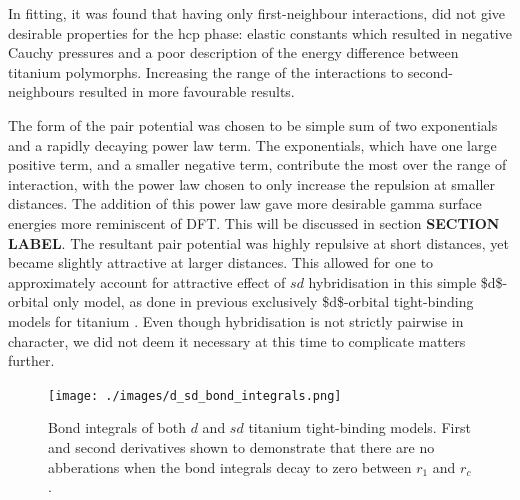 \documentclass[a4paper,12pt,oneside,print,numbered,index,PageStyleIII]{PhDThesisPSnPDF}
\begin{document}
In fitting, it was found that having only first-neighbour
interactions, did not give desirable properties for the hcp phase:
elastic constants which resulted in negative Cauchy pressures and a
poor description of the energy difference between titanium
polymorphs. Increasing the range of the interactions to
second-neighbours resulted in more favourable results.


The form of the pair potential was chosen to be simple sum of two
exponentials and a rapidly decaying power law term. The exponentials,
which have one large positive term, and a smaller negative term,
contribute the most over the range of interaction, with the power
law chosen to only increase the repulsion at smaller distances. The
addition of this power law gave more desirable gamma surface
energies more reminiscent of DFT. This will be discussed in section
\textbf{SECTION LABEL}. The resultant pair potential was highly repulsive
at short distances, yet became slightly
attractive at larger distances. This allowed for one to
approximately account for attractive effect of \(sd\) hybridisation
in this simple \$d\$-orbital only model, as done
in previous exclusively \$d\$-orbital tight-binding models for
titanium \cite{Girshick1998a}. Even though hybridisation is
not strictly pairwise in character, we did not deem it necessary at
this time to complicate matters further.


\begin{figure}[H]
  \begin{center}
    \texttt{[image: ./images/d\_sd\_bond\_integrals.png]}
    \caption[Bond integrals of both $d$ and $sd$ titanium tight-binding models.] {Bond integrals of both $d$ and $sd$ titanium tight-binding models. First and second derivatives shown to demonstrate that there are no abberations when the bond integrals decay to zero between $r_1$ and $r_c$.} %
    \label{fig:d_sd_bond_integrals}
  \end{center}
\end{figure}
\end{document}
